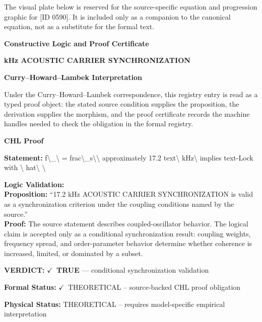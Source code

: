 \begingroup\footnotesize\sloppy
The visual plate below is reserved for the source-specific equation and progression graphic for [ID 0590]. It is included only as a companion to the canonical equation, not as a substitute for the formal text.
\par\endgroup
\ifTZPDarkEdition
{}
\fi

\clearpage
\begingroup\tzpsupportsetup
\noindent\textbf{\fontsize{10.8pt}{12.8pt}\selectfont [ID 0590] Constructive Logic and Proof Certificate}\par
\noindent\textbf{\fontsize{10pt}{12pt} kHz ACOUSTIC CARRIER SYNCHRONIZATION}\par
\vspace{0.45em}
\begingroup
\footnotesize
\setlength{\parskip}{0.22em}
\setlength{\parindent}{0pt}
\noindent\textbf{Curry--Howard--Lambek Interpretation}\par
Under the Curry--Howard--Lambek correspondence, this registry entry is read as a typed proof
object: the stated source condition supplies the proposition, the derivation supplies the
morphism, and the proof certificate records the machine handles needed to check the obligation
in the formal registry.

\vspace{0.45em}
\noindent\textbf{CHL Proof}\par
\textbf{Statement:} f\textbackslash{}\_\textbackslash{} = frac\textbackslash{}\_s\textbackslash{}\textbackslash{} approximately 17.2 text\textbackslash{} kHz\textbackslash{} implies text-Lock with \textbackslash{} hat\textbackslash{} \textbackslash{}

\textbf{Logic Validation:}\\
\textbf{Proposition:} ``17.2 kHz ACOUSTIC CARRIER SYNCHRONIZATION is valid as a synchronization criterion under
the coupling conditions named by the source.''\\
\textbf{Proof:} The source statement describes coupled-oscillator behavior. The logical claim is
accepted only as a conditional synchronization result: coupling weights, frequency
spread, and order-parameter behavior determine whether coherence is increased, limited,
or dominated by a subset.

\textbf{VERDICT:} \ensuremath{\checkmark}\ \textbf{TRUE} --- conditional synchronization validation

\textbf{Formal Status:} \ensuremath{\checkmark}\ THEORETICAL -- source-backed CHL proof obligation

\textbf{Physical Status:} THEORETICAL -- requires model-specific empirical interpretation
\par\vspace{0.45em}
\par
\ifTZPDarkEdition
{}
\fi
\endgroup
\endgroup
